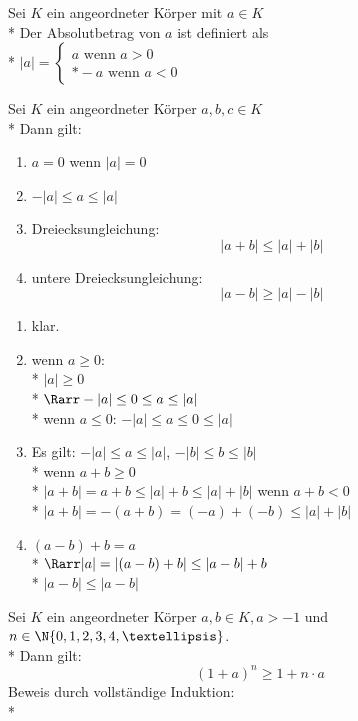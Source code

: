 	Sei $K$ ein angeordneter Körper mit $a \in K$\\*
	Der Absolutbetrag von $a$ ist definiert als \\*
	$|a| = \left\lbrace \begin{array}{lll}
	a\text{ wenn }a > 0\\*
	-a\text{ wenn }a < 0
	\end{array}\right.$

	Sei $K$ ein angeordneter Körper $a, b, c \in K$\\*
	Dann gilt:
	\begin{enumerate}
	\item{$a = 0$ wenn $|a| = 0$}
	\item{$-|a| \leq a \leq |a|$}
	\item{Dreiecksungleichung:
	$$|a + b| \leq |a| + |b|$$}
	\item{untere Dreiecksungleichung:
	$$|a - b| \geq |a| - |b|$$}
	\end{enumerate}
\bew
	\begin{enumerate}
	\item{klar.}
	\item{wenn $a \geq 0$:\\*
	$|a| \geq 0$\\*
	$\Rarr -|a| \leq 0 \leq a \leq |a|$\\*
	wenn $a \leq 0$:
	$-|a| \leq a \leq 0 \leq |a|$}
	\item{Es gilt: $-|a| \leq a \leq |a|$, $-|b| \leq b \leq |b|$\\*
	wenn $a + b \geq 0$\\*
	$|a + b| = a + b \leq |a| + b \leq |a| + |b|$
	wenn $a + b < 0$\\*
	$|a + b| = -(a + b) = (-a) + (-b) \leq |a| + |b|$}
	\item{$(a - b) + b = a$\\*
	$\Rarr |a| = |(a - b) + b| \leq |a - b| + b$\\*
	$|a - b| \leq |a - b|$} %
	\end{enumerate}

	Sei $K$ ein angeordneter Körper $a, b \in K, a > -1$ und $n \in \N \{0, 1, 2, 3, 4, …\}$.\\*
	Dann gilt:
	$$(1 + a)^n \geq 1 + n \cdot a$$
	Beweis durch vollständige Induktion:\\*


